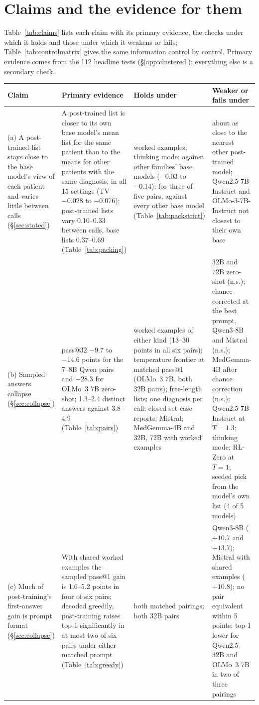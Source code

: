 \documentclass[11pt]{article}
\begin{document}
\section{Claims and the evidence for them}\label{app:claims}
Table~\ref{tab:claims} lists each claim with its primary evidence, the checks under which it holds and those under which it weakens or fails; Table~\ref{tab:controlmatrix} gives the same information control by control. Primary evidence comes from the 112 headline tests (\S\ref{app:clustered}); everything else is a secondary check.

\begin{table}[p]
\centering\scriptsize
\setlength{\tabcolsep}{2.5pt}
\renewcommand{\arraystretch}{1.0}
\begin{tabular}{L{2.8cm}L{4.6cm}L{3.4cm}L{3.6cm}}
\toprule
Claim & Primary evidence & Holds under & Weaker or fails under \\
\midrule
(a) A post-trained list stays close to the base model's view of each patient and varies little between calls (\S\ref{sec:stated}) & A post-trained list is closer to its own base model's mean list for the same patient than to the means for other patients with the same diagnosis, in all 15 settings (TV $-0.028$ to $-0.076$); post-trained lists vary 0.10--0.33 between calls, base lists 0.37--0.69 (Table~\ref{tab:packing}) & worked examples; thinking mode; against other families' base models ($-0.03$ to $-0.14$); for three of five pairs, against every other base model (Table~\ref{tab:packstrict}) & about as close to the nearest other post-trained model; Qwen2.5-7B-Instruct and OLMo-3-7B-Instruct not closest to their own base \\
(b) Sampled answers collapse (\S\ref{sec:collapse}) & pass@32 $-9.7$ to $-14.6$ points for the 7--8B Qwen pairs and $-28.3$ for OLMo~3 7B zero-shot; 1.3--2.4 distinct answers against 3.8--4.9 (Table~\ref{tab:pairs}) & worked examples of either kind (13--30 points in all six pairs); temperature frontier at matched pass@1 (OLMo~3 7B, both 32B pairs); free-length lists; one diagnosis per call; closed-set case reports; Mistral; MedGemma-4B and 32B, 72B with worked examples & 32B and 72B zero-shot (n.s.); chance-corrected at the best prompt, Qwen3-8B and Mistral (n.s.); MedGemma-4B after chance correction (n.s.); Qwen2.5-7B-Instruct at $T{=}1.3$; thinking mode; RL-Zero at $T{=}1$; seeded pick from the model's own list (4 of 5 models) \\
(c) Much of post-training's first-answer gain is prompt format (\S\ref{sec:collapse}) & With shared worked examples the sampled pass@1 gain is 1.6--5.2 points in four of six pairs; decoded greedily, post-training raises top-1 significantly in at most two of six pairs under either matched prompt (Table~\ref{tab:greedy}) & both matched pairings; both 32B pairs & Qwen3-8B ($+10.7$ and $+13.7$); Mistral with shared examples ($+10.8$); no pair equivalent within 5 points; top-1 lower for Qwen2.5-32B and OLMo~3 7B in two of three pairings \\

\end{tabular}
\end{table}
\end{document}
